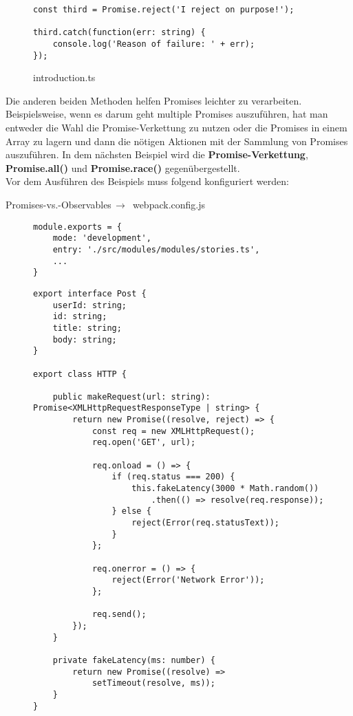 \begin{figure}[H]
\begin{lstlisting}
const third = Promise.reject('I reject on purpose!');

third.catch(function(err: string) {
    console.log('Reason of failure: ' + err);
});
\end{lstlisting}
\caption{introduction.ts}
\end{figure}

\noindent
Die anderen beiden Methoden helfen Promises leichter zu verarbeiten. Beispielsweise, wenn es darum geht multiple Promises auszuführen, hat man entweder die Wahl die Promise-Verkettung zu nutzen oder die Promises in einem Array zu lagern und dann die nötigen Aktionen mit der Sammlung von Promises auszuführen. In dem nächsten Beispiel wird die \textbf{Promise-Verkettung}, \textbf{Promise.all()} und \textbf{Promise.race()} gegenübergestellt.\\

\noindent
Vor dem Ausführen des Beispiels muss folgend konfiguriert werden:

 \begin{center}
     Promises-vs.-Observables$\,\to\,$ webpack.config.js
 \end{center}

\begin{figure}[H]
\begin{lstlisting}
module.exports = {
    mode: 'development',
    entry: './src/modules/modules/stories.ts',
    ...
}
\end{lstlisting}
\end{figure}


\begin{figure}[H]
\begin{lstlisting}
export interface Post {
    userId: string;
    id: string;
    title: string;
    body: string;
}

export class HTTP {

    public makeRequest(url: string): Promise<XMLHttpRequestResponseType | string> {
        return new Promise((resolve, reject) => {
            const req = new XMLHttpRequest();
            req.open('GET', url);

            req.onload = () => {
                if (req.status === 200) {
                    this.fakeLatency(3000 * Math.random())
                        .then(() => resolve(req.response));
                } else {
                    reject(Error(req.statusText));
                }
            };

            req.onerror = () => {
                reject(Error('Network Error'));
            };

            req.send();
        });
    }

    private fakeLatency(ms: number) {
        return new Promise((resolve) =>
            setTimeout(resolve, ms));
    }
}
\end{lstlisting}
\end{figure}

